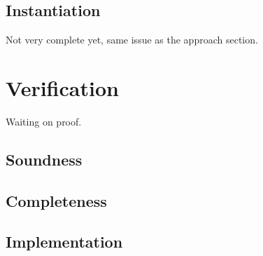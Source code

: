 \documentclass{report}
\begin{document}
\subsection{Instantiation}
Not very complete yet, same issue as the approach section.
\section{Verification}
Waiting on proof.
\subsection{Soundness}
\subsection{Completeness}
\subsection{Implementation}
\end{document}
